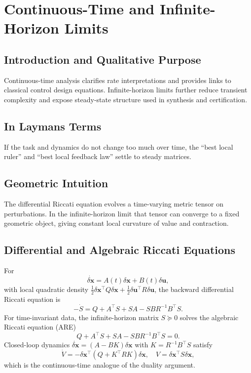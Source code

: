 \documentclass[11pt,letterpaper]{article}
\newcommand{\dx}{\delta\mathbf{x}}
\newcommand{\du}{\delta\mathbf{u}}
\begin{document}
\section{Continuous-Time and Infinite-Horizon Limits}

\subsection{Introduction and Qualitative Purpose}
Continuous-time analysis clarifies rate interpretations and provides links to classical control design equations. Infinite-horizon limits further reduce transient complexity and expose steady-state structure used in synthesis and certification.

\subsection{In Laymans Terms}
If the task and dynamics do not change too much over time, the ``best local ruler'' and ``best local feedback law'' settle to steady matrices.

\subsection{Geometric Intuition}
The differential Riccati equation evolves a time-varying metric tensor on perturbations. In the infinite-horizon limit that tensor can converge to a fixed geometric object, giving constant local curvature of value and contraction.

\subsection{Differential and Algebraic Riccati Equations}
For
\begin{equation}
\dot{\dx} = A(t)\dx + B(t)\du,
\label{eq:ct-perturbation}
\end{equation}
with local quadratic density $\frac12\dx^\top Q\dx + \frac12\du^\top R\du$, the backward differential Riccati equation is
\begin{equation}
-\dot S = Q + A^\top S + SA - SBR^{-1}B^\top S.
\label{eq:dre}
\end{equation}
For time-invariant data, the infinite-horizon matrix $S\succeq0$ solves the algebraic Riccati equation (ARE)
\begin{equation}
Q + A^\top S + SA - SBR^{-1}B^\top S = 0.
\label{eq:are}
\end{equation}
Closed-loop dynamics $\dot{\dx} = (A-BK)\dx$ with $K=R^{-1}B^\top S$ satisfy
\begin{equation}
\dot V = -\dx^\top(Q+K^\top RK)\dx,
\quad V=\dx^\top S\dx,
\label{eq:ct-value-drop}
\end{equation}
which is the continuous-time analogue of the duality argument.
\end{document}
